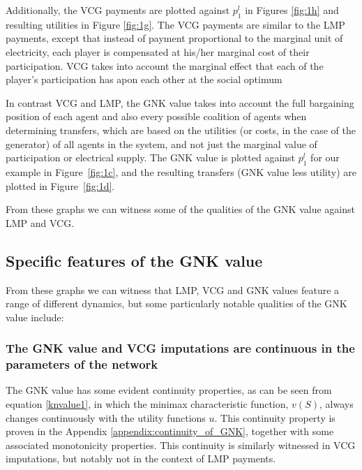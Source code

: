 Additionally, the VCG payments are plotted against $p_1^l$ in Figures \ref{fig:1h} and resulting utilities in Figure \ref{fig:1g}.
The VCG payments are similar to the LMP payments, except that instead of payment proportional to the marginal unit of electricity, each player is compensated at his/her marginal cost of their participation.
VCG takes into account the marginal effect that each of the player's participation has apon each other at the social optimum

In contrast VCG and LMP, the GNK value takes into account the full bargaining position of each agent and also every possible coalition of agents when determining transfers, which are based on the utilities (or costs, in the case of the generator) of all agents in the system, and not just the marginal value of participation or electrical supply.
The GNK value is plotted against $p_1^l$ for our example in Figure~\ref{fig:1c}, and the resulting transfers (GNK value less utility) are plotted in Figure~\ref{fig:1d}.

From these graphs we can witness some of the qualities of the GNK value against LMP and VCG.

\subsection{Specific features of the GNK value}

From these graphs we can witness that LMP, VCG and GNK values feature a range of different dynamics,
but some particularly notable qualities of the GNK value include:


\subsubsection*{The GNK value and VCG imputations are continuous in the parameters of the network}
The GNK value has some evident continuity properties, as can be seen from equation \ref{knvalue1}, in which the minimax characteristic function, $v(S)$, always changes continuously with the utility functions $u$.
This continuity property is proven in the Appendix \ref{appendix:continuity_of_GNK}, together with some associated monotonicity properties.
This continuity is similarly witnessed in VCG imputations, but notably not in the context of LMP payments.

